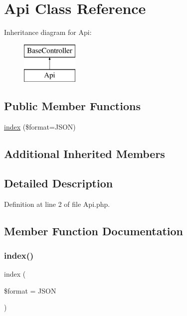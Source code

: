 \hypertarget{class_api}{}\section{Api Class Reference}
\label{class_api}
Inheritance diagram for Api\+:\begin{figure}[H]
\begin{center}
\leavevmode
\includegraphics[height=2.000000cm]{class_api}
\end{center}
\end{figure}
\subsection*{Public Member Functions}
\begin{DoxyCompactItemize}
\item 
\hyperlink{class_api_a35a89e327df5738c7786b030eea4fb1a}{index} (\$format=\textquotesingle{}J\+S\+ON\textquotesingle{})
\end{DoxyCompactItemize}
\subsection*{Additional Inherited Members}


\subsection{Detailed Description}


Definition at line 2 of file Api.\+php.



\subsection{Member Function Documentation}
\hypertarget{class_api_a35a89e327df5738c7786b030eea4fb1a}{}\label{class_api_a35a89e327df5738c7786b030eea4fb1a} 
\subsubsection{\texorpdfstring{index()}{index()}}
{\footnotesize\ttfamily index (\begin{DoxyParamCaption}\item[{}]{\$format = {\ttfamily \textquotesingle{}JSON\textquotesingle{}} }\end{DoxyParamCaption})}



